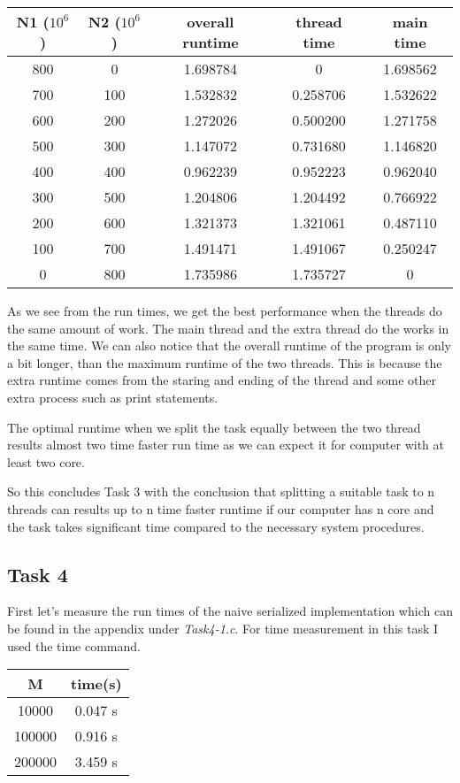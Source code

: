 \begin{tabular}{c | c || c | c | c}
 N1 ($10^6$)& N2 ($10^6$)& overall runtime & thread time & main time\\ \hline 
 800 & 0 & 1.698784 & 0 & 1.698562\\
 700 & 100 & 1.532832 & 0.258706 & 1.532622\\
 600 & 200 & 1.272026 & 0.500200 & 1.271758\\
 500 & 300 & 1.147072 & 0.731680 & 1.146820\\
 400 & 400 & 0.962239 & 0.952223 & 0.962040\\
 300 & 500 & 1.204806 & 1.204492 & 0.766922\\
 200 & 600 & 1.321373 & 1.321061 & 0.487110\\
 100 & 700 & 1.491471 & 1.491067 & 0.250247\\
 0 & 800 & 1.735986 & 1.735727 & 0
 \end{tabular} 
 
As we see from the run times, we get the best performance when the threads do the same amount of work. The main thread and the extra thread do the works in the same time. We can also notice that the overall runtime of the program is only a bit longer, than the maximum runtime of the two threads. This is because the extra runtime comes from the staring and ending of the thread and some other extra process such as print statements.
 
The optimal runtime when we split the task equally between the two thread results almost two time faster run time as we can expect it for computer with at least two core.

So this concludes Task 3 with the conclusion that splitting a suitable task to n threads can results up to n time faster runtime if our computer has n core and the task takes significant time compared to the necessary system procedures.     

\subsection*{Task 4}
First let's measure the run times of the naive serialized implementation which can be found in the appendix under \textit{Task4-1.c}. For time measurement in this task I used the time command.

\begin{tabular}{c | c}
M & time(s)\\ \hline
10000 & 0.047 s\\
100000 & 0.916 s\\
200000 & 3.459 s 
\end{tabular}

